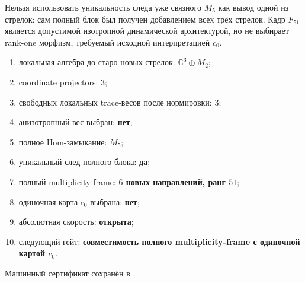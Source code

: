\begin{nogocriterion}
Нельзя использовать уникальность следа уже связного $M_5$ как вывод одной
из стрелок: сам полный блок был получен добавлением всех трёх стрелок.
Кадр $F_{51}$ является допустимой изотропной динамической архитектурой, но
не выбирает rank-one морфизм, требуемый исходной интерпретацией $c_0$.
\end{nogocriterion}

\begin{protocol}\begin{enumerate}
\item локальная алгебра до старо-новых стрелок: \textbf{$\mathbb C^3\oplus M_2$};
\item coordinate projectors: \textbf{$3$};
\item свободных локальных trace-весов после нормировки: \textbf{$3$};
\item анизотропный вес выбран: \textbf{нет};
\item полное Hom-замыкание: \textbf{$M_5$};
\item уникальный след полного блока: \textbf{да};
\item полный multiplicity-frame: \textbf{$6$ новых направлений, ранг $51$};
\item одиночная карта $c_0$ выбрана: \textbf{нет};
\item абсолютная скорость: \textbf{открыта};
\item следующий гейт: \textbf{совместимость полного multiplicity-frame с
одиночной картой $c_0$}.
\end{enumerate}\end{protocol}

Машинный сертификат сохранён в
.